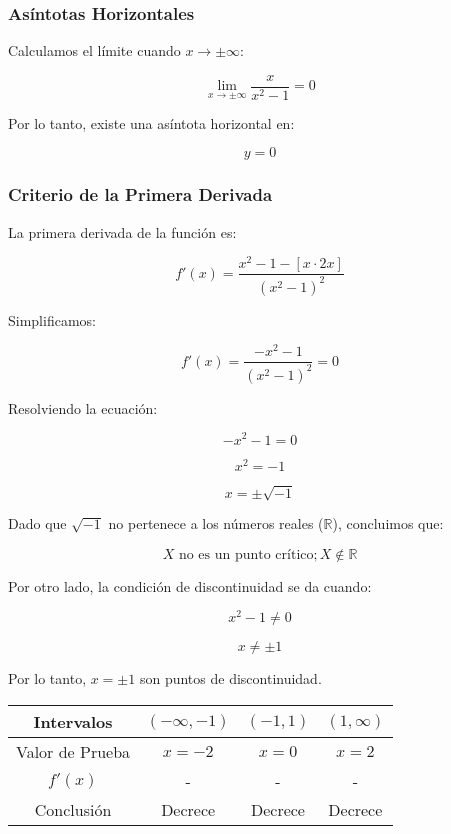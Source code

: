 \subsubsection*{Asíntotas Horizontales}

Calculamos el límite cuando $x \to \pm \infty$:

\[
\lim_{x \to \pm \infty} \frac{x}{x^2 - 1} = 0
\]

Por lo tanto, existe una asíntota horizontal en:

\[y = 0\]


\subsubsection*{Criterio de la Primera Derivada}

La primera derivada de la función es:

\[f'(x) = \frac{x^2 - 1 - \left[x \cdot 2x\right]}{(x^2 - 1)^2}\]

Simplificamos:

\[f'(x) = \frac{-x^2 - 1}{(x^2 - 1)^2} = 0\]

Resolviendo la ecuación:

\[-x^2 - 1 = 0\]

\[x^2 = -1\]

\[x = \pm \sqrt{-1}\]

Dado que $\sqrt{-1}$ no pertenece a los números reales ($\mathbb{R}$), concluimos que:

\[X \text{ no es un punto crítico}; X \notin \mathbb{R}\]

Por otro lado, la condición de discontinuidad se da cuando:

\[
x^2 - 1 \neq 0
\]

\[
x \neq \pm 1
\]

Por lo tanto, $x = \pm 1$ son puntos de discontinuidad.

\begin{center}
    \begin{tabular}{|c|c|c|c|}
        \hline
        Intervalos & $(-\infty,-1)$ & $(-1,1)$ & $(1,\infty)$ \\
        \hline
        Valor de Prueba & $x=-2$ & $x=0$ & $x=2$ \\
        \hline
        $f'(x)$ & - & - & - \\
        \hline
        Conclusión & Decrece & Decrece & Decrece \\
        \hline
    \end{tabular}
\end{center}


